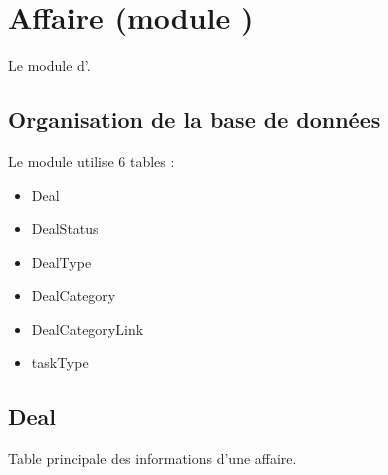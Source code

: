 

\clearpage
\section{Affaire (module \deal)}

Le module \deal d'\obm.

\subsection{Organisation de la base de données}

Le module \deal utilise 6 tables :
\begin{itemize}
 \item Deal
 \item DealStatus
 \item DealType
 \item DealCategory
 \item DealCategoryLink
 \item taskType
\end{itemize}

\subsection{Deal}
Table principale des informations d'une affaire.\\

